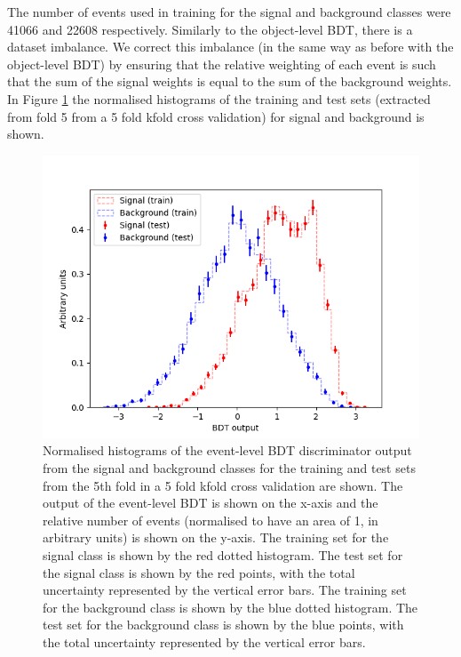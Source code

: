 The number of events used in training for the signal and background classes were 41066 and 22608 respectively. Similarly to the object-level BDT, there is a dataset imbalance. We correct this imbalance (in the same way as before with the object-level BDT) by ensuring that the relative weighting of each event is such that the sum of the signal weights is equal to the sum of the background weights.\\

In Figure \ref{fig:event-bdt-overtrain-check} the normalised histograms of the training and test sets (extracted from fold 5 from a 5 fold kfold cross validation) for signal and background is shown.
\begin{figure}[h!]
	\includegraphics[scale=0.6]{figures/overtrainingCheck_4lep_event.png}
	\centering
	\caption{Normalised histograms of the event-level BDT discriminator output from the signal and background classes for the training and test sets from the 5th fold in a 5 fold kfold cross validation are shown. The output of the event-level BDT is shown on the x-axis and the relative number of events (normalised to have an area of 1, in arbitrary units) is shown on the y-axis. The training set for the signal class is shown by the red dotted histogram. The test set for the signal class is shown by the red points, with the total uncertainty represented by the vertical error bars. The training set for the background class is shown by the blue dotted histogram. The test set for the background class is shown by the blue points, with the total uncertainty represented by the vertical error bars.}
	\label{fig:event-bdt-overtrain-check}
\end{figure}

